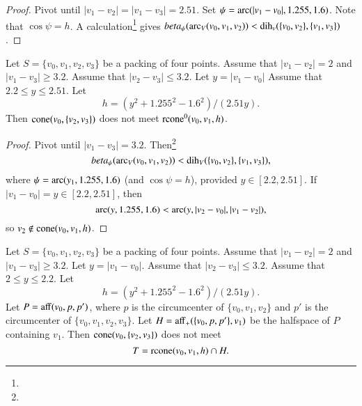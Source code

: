 \begin{tarskidata}
\begin{tarski}
\begin{proof}  Pivot until
$|v_1-v_2|=|v_1-v_3|=2.51$.   
Set
$\psi=\operatorname{arc}(|v_1-v_0|,1.255,1.6)$.  Note that $\cos\psi=h$.
A calculation\footnote{} %
gives $beta_\psi(\operatorname{arc}_V(v_0,v_1,v_2))<\operatorname{dih}_v(\{v_0,v_2\},\{v_1,v_3\})$.
\end{proof}
\end{tarski}




\begin{tarski}

\begin{lemma} 
Let $S=\{v_0,v_1,v_2,v_3\}$ be a packing of four points.
Assume that
$|v_1-v_2|=2$ and $|v_1-v_3|\ge3.2$.
Assume that $|v_2-v_3|\le 3.2$. Let $y = |v_1-v_0|$
Assume that $2.2\le y\le 2.51$.
Let
$$
  h= (y^2+1.255^2-1.6^2)/(2.51 y).
$$
Then ${\operatorname{cone}}(v_0,\{v_2,v_3\})$ does not meet
${\operatorname{rcone}}^0(v_0,v_1,h)$.
\end{lemma}


\begin{proof}
Pivot until
$|v_1-v_3|=3.2$. Then\footnote{} %
    $$beta_\psi(\operatorname{arc}_V(v_0,v_1,v_2))< \operatorname{dih}_V(\{v_0,v_2\},\{v_1,v_3\}),$$
where $\psi=\operatorname{arc}(y_1,1.255,1.6)$ (and $\cos\psi=h$),
provided $y\in[2.2,2.51]$. If
$|v_1-v_0|=y\in[2.2,2.51]$, then
    $$\operatorname{arc}(y,1.255,1.6)<\operatorname{arc}(y,|v_2-v_0|,|v_1-v_2|),$$
so $v_2\not\in{\operatorname{cone}}(v_0,v_1,h)$.
\end{proof}
\end{tarski}






\begin{tarski}

\begin{lemma} 
Let $S=\{v_0,v_1,v_2,v_3\}$ be a packing of four points.
Assume that
$|v_1-v_2|=2$ and $|v_1-v_3|\ge3.2$.
Let $y = |v_1-v_0|$.
Assume that $|v_2-v_3|\le 3.2$.
Assume that $2\le y\le 2.2$.
Let 
$$
  h=(y^2+1.255^2-1.6^2)/(2.51 y).
$$
Let $P={\operatorname{aff}}(v_0,p,p')$, where $p$ is the circumcenter
of $\{v_0,v_1,v_2\}$ and $p'$ is the circumcenter of $\{v_0,v_1,v_2,v_3\}$.  
Let $H = {\operatorname{aff}}_+(\{v_0,p,p'\},v_1)$ 
be the halfspace of $P$ containing
$v_1$. 
Then ${\operatorname{cone}}(v_0,\{v_2,v_3\})$ does not meet
$$
  T={\operatorname{rcone}}(v_0,v_1,h) \cap H.
$$
\end{lemma}


\end{tarski}
\end{tarskidata}
